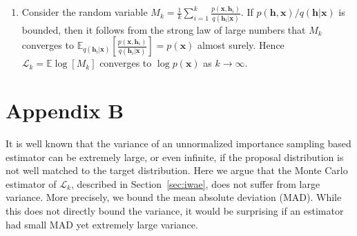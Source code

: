 \documentclass{article} %
\newcommand{\expect}{\mathbb{E}}
\newcommand{\hid}{\mathbf{h}}
\newcommand{\hidS}[1]{\hid_{#1}}
\newcommand{\obs}{\mathbf{x}}
\newcommand{\pmfGen}{p}
\newcommand{\pmfRec}{q}
\newcommand{\numSamples}{k}
\newcommand{\numSamplesTwo}{m}
\newcommand{\sampleIdx}{i}
\newcommand{\sampleIdxTwo}{j}
\newcommand{\isBoundK}[1]{\mathcal{L}_{#1}}
\newcommand{\indices}{I}
\begin{document}
\begin{enumerate}
Using this observation and Jensen's inequality, we get
\begin{align}
\isBoundK{\numSamples} &= \expect_{\hidS{1},\ldots,\hidS{\numSamples}} \left[ \log \frac{1}{\numSamples} \sum_{\sampleIdx=1}^\numSamples \frac{\pmfGen(\obs,\hidS{\sampleIdx})}{\pmfRec(\hidS{\sampleIdx}|\obs)} \right]\\
&= \expect_{\hidS{1},\ldots,\hidS{\numSamples}} \left[ \log\expect_{\indices=\{\sampleIdx_1,\ldots,\sampleIdx_\numSamplesTwo\}}\left[\frac{1}{\numSamplesTwo} \sum_{\sampleIdxTwo=1}^\numSamplesTwo \frac{\pmfGen(\obs,\hidS{\sampleIdx_\sampleIdxTwo})}{\pmfRec(\hidS{\sampleIdx_\sampleIdxTwo}|\obs)} \right] \right] \\
& \geq \expect_{\hidS{1},\ldots,\hidS{\numSamples}} \left[ \expect_{\indices=\{\sampleIdx_1,\ldots,\sampleIdx_\numSamplesTwo\}} \left[ \log \frac{1}{\numSamplesTwo} \sum_{\sampleIdxTwo=1}^\numSamplesTwo \frac{\pmfGen(\obs,\hidS{\sampleIdx_\sampleIdxTwo})}{\pmfRec(\hidS{\sampleIdx_\sampleIdxTwo}|\obs)} \right] \right] \\
&=\expect_{\hidS{1},\ldots,\hidS{\numSamplesTwo}}\left[\log \frac{1}{\numSamplesTwo} \sum_{\sampleIdx=1}^\numSamplesTwo \frac{\pmfGen(\obs,\hidS{\sampleIdx})}{\pmfRec(\hidS{\sampleIdx}|\obs)} \right]=\isBoundK{\numSamplesTwo}
\end{align}
\item Consider the random variable 
$M_k = \frac{1}{\numSamples} \sum_{\sampleIdx=1}^\numSamples \frac{\pmfGen(\obs,\hidS{\sampleIdx})}{\pmfRec(\hidS{\sampleIdx}|\obs)} $. If $\pmfGen(\hid, \obs) / \pmfRec(\hid | \obs)$ is bounded, then it follows from the strong law of large numbers that $M_k$ converges to $\expect_{\pmfRec(\hidS{\sampleIdx}|\obs)} \left[ \frac{\pmfGen(\obs,\hidS{\sampleIdx})}{\pmfRec(\hidS{\sampleIdx}|\obs)}  \right] = \pmfGen(\obs)$ almost surely. Hence $\isBoundK{\numSamples}=\expect \log [M_k]$ converges to $\log \pmfGen(\obs)$ as $\numSamples\to \infty$.
\end{enumerate}



\section*{Appendix B}
\label{app:is_variance}

It is well known that the variance of an unnormalized importance sampling based estimator can be extremely large, or even infinite, if the proposal distribution is not well matched to the target distribution. Here we argue that the Monte Carlo estimator of $\isBoundK{\numSamples}$, described in Section~\ref{sec:iwae}, does not suffer from large variance. More precisely, we bound the mean absolute deviation (MAD). While this does not directly bound the variance, it would be surprising if an estimator had small MAD yet extremely large variance.
\end{document}
